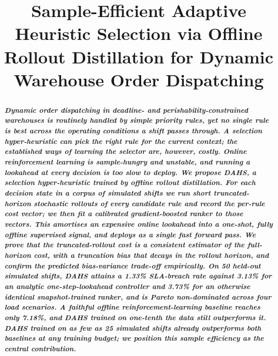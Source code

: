 \documentclass[conference]{IEEEtran}
\begin{document}
\title{Sample-Efficient Adaptive Heuristic Selection via Offline Rollout
Distillation for Dynamic Warehouse Order Dispatching}

\author{%
\and
{}
\and
{}
}

\maketitle

\begin{abstract}
\textbf{\textit{%
Dynamic order dispatching in deadline- and perishability-constrained warehouses
is routinely handled by simple priority rules, yet no single rule is best across
the operating conditions a shift passes through. A selection hyper-heuristic can
pick the right rule for the current context; the established ways of learning the
selector are, however, costly. Online reinforcement learning is sample-hungry and
unstable, and running a lookahead at every decision is too slow to deploy. We
propose DAHS, a selection hyper-heuristic trained by offline rollout distillation.
For each decision state in a corpus of simulated shifts we run short
truncated-horizon stochastic rollouts of every candidate rule and record the
per-rule cost vector; we then fit a calibrated gradient-boosted ranker to those
vectors. This amortises an expensive online lookahead into a one-shot, fully
offline supervised signal, and deploys as a single fast forward pass. We prove
that the truncated-rollout cost is a consistent estimator of the full-horizon
cost, with a truncation bias that decays in the rollout horizon, and confirm the
predicted bias-variance trade-off empirically. On 50 held-out simulated shifts,
DAHS attains a 1.33\% SLA-breach rate against 3.13\% for an analytic
one-step-lookahead controller and 3.73\% for an otherwise identical
snapshot-trained ranker, and is Pareto non-dominated across four load scenarios.
A faithful offline reinforcement-learning baseline reaches only 7.18\%, and DAHS
trained on one-tenth the data still outperforms it. DAHS trained on as few as 25
simulated shifts already outperforms both baselines at any training budget; we
position this sample efficiency as the central contribution.%
}}
\end{abstract}
\end{document}
